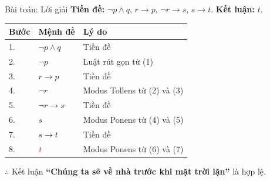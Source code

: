 \documentclass[aspectratio=169, 11pt]{beamer}
\begin{document}
\begin{frame}{Bài toán: Lời giải}
\textbf{Tiền đề:} $\neg p \land q$, $r \rightarrow p$, $\neg r \rightarrow s$, $s \rightarrow t$. \textbf{Kết luận:} $t$.

\vspace{0.2cm}
\begin{center}
\begin{tabular}{lll}
\toprule
\textbf{Bước} & \textbf{Mệnh đề} & \textbf{Lý do} \\
\midrule
1. & $\neg p \land q$ & Tiền đề \\
2. & $\neg p$ & Luật rút gọn từ (1) \\
3. & $r \rightarrow p$ & Tiền đề \\
4. & $\neg r$ & Modus Tollens từ (2) và (3) \\
5. & $\neg r \rightarrow s$ & Tiền đề \\
6. & $s$ & Modus Ponens từ (4) và (5) \\
7. & $s \rightarrow t$ & Tiền đề \\
8. & $\textcolor{red}{t}$ & Modus Ponens từ (6) và (7) \\
\bottomrule
\end{tabular}
\end{center}

\vspace{0.15cm}
\centering
$\therefore$ Kết luận \textbf{``Chúng ta sẽ về nhà trước khi mặt trời lặn''} là hợp lệ.
\end{frame}
\end{document}
